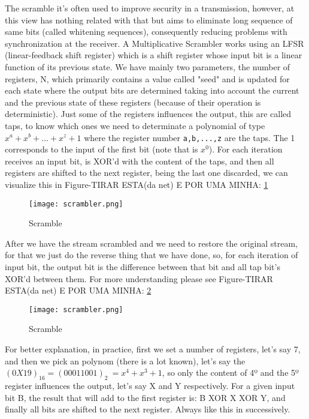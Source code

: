 \documentclass[a4paper, 10pt, conference]{ieeeconf}      %
\begin{document}
    
    The scramble it's often used to improve security in a transmission, however, at this view has nothing related with that but aims to eliminate long sequence of same bits (called whitening sequences), consequently reducing problems with synchronization at the receiver. A Multiplicative Scrambler works using an LFSR (linear-feedback shift register) which is a shift register whose input bit is a linear function of its previous state. We have mainly two parameters, the number of registers, N, which primarily contains a value called "seed" and is updated for each state where the output bits are determined taking into account the current and the previous state of these registers (because of their operation is deterministic). Just some of the registers influences the output, this are called taps, to know which ones we need to determinate a polynomial of type \(x^a + x^b + ... + x^z + 1\) where the register number \verb|a,b,...,z| are the taps. The 1 corresponds to the input of the first bit (note that is \(x^0\)). For each iteration receives an input bit, is XOR'd with the content of the taps, and then all registers are shifted to the next register, being the last one discarded, we can visualize this in Figure-TIRAR ESTA(da net) E POR UMA MINHA: \ref{fig:scramble}
    
    \begin{figure}
        \centering
        \texttt{[image: scrambler.png]}
        \caption{Scramble}
        \label{fig:scramble}
    \end{figure}
    
    
    After we have the stream scrambled and we need to restore the original stream, for that we just do the reverse thing that we have done, so, for each iteration of input bit, the output bit is the difference between that bit and all tap bit's XOR'd between them. For more understanding please see Figure-TIRAR ESTA(da net) E POR UMA MINHA: \ref{fig:descramble}
    
    \begin{figure}
        \centering
        \texttt{[image: scrambler.png]}
        \caption{Scramble}
        \label{fig:descramble}
    \end{figure}
    

    For better explanation, in practice, first we set a number of registers, let's say 7, and then we pick an polynom (there is a lot known), let's say the \((0X19)_{16} = (00011001)_2\ = x^4 + x^3 + 1\), so only the content of 4º and the 5º register influences the output, let's say X and Y respectively. For a given input bit B, the result that will add to the first register is: B XOR X XOR Y, and finally all bits are shifted to the next register. Always like this in successively. 
    
\end{document}
